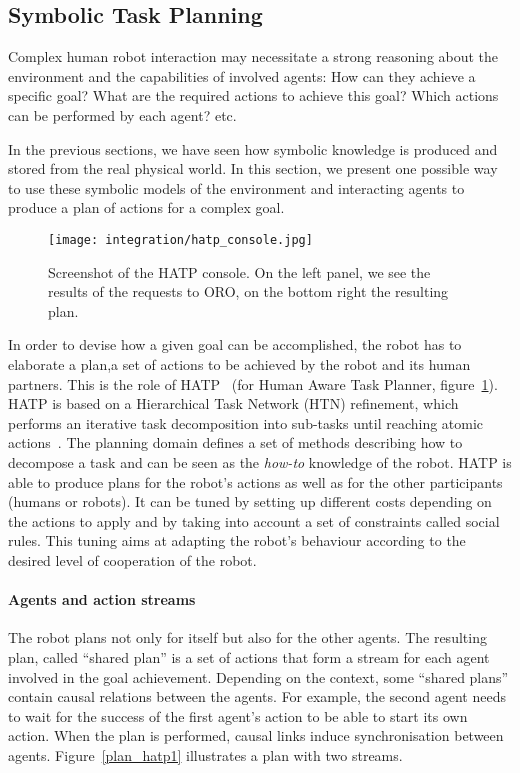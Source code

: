 
\subsection{Symbolic Task Planning}

Complex human robot interaction may necessitate a strong reasoning about the
environment and the capabilities of involved agents: How can they achieve a
specific goal? What are the required actions to achieve this goal? Which
actions can be performed by each agent? etc.

In the previous sections, we have seen how symbolic knowledge is produced and
stored from the real physical world. In this section, we present one possible
way to use these symbolic models of the environment and interacting agents to
produce a plan of actions for a complex goal.

\begin{figure}
    \centering
    \texttt{[image: integration/hatp\_console.jpg]}
    \caption{Screenshot of the HATP console. On the left panel, we see the
    results of the requests to ORO, on the bottom right the resulting plan.}
    \label{fig|hatp_console}
\end{figure}

In order to devise how a given goal can be accomplished, the robot has to
elaborate a plan,\ie a set of actions to be achieved by the robot and its human
partners.  This is the role of HATP~\cite{Alili2009} (for Human Aware Task
Planner, figure~\ref{fig|hatp_console}).  HATP is based on a Hierarchical Task
Network (HTN) refinement, which performs an iterative task decomposition into
sub-tasks until reaching atomic actions~\cite{Nau2003}.  The planning domain
defines a set of methods describing how to decompose a task and can be seen as
the {\it how-to} knowledge of the robot.  HATP is able to produce plans for the
robot's actions as well as for the other participants (humans or robots). It
can be tuned by setting up different costs depending on the actions to apply
and by taking into account a set of constraints called social rules. This
tuning aims at adapting the robot's behaviour according to the desired level of
cooperation of the robot.

\paragraph{Agents and action streams} The robot plans not only for itself but
also for the other agents. The resulting plan, called ``shared plan'' is a set
of actions that form a stream for each agent involved in the goal achievement.
Depending on the context, some ``shared plans'' contain causal relations
between the agents. For example, the second agent needs to wait for the success
of the first agent's action to be able to start its own action. When the plan
is performed, causal links induce synchronisation between agents.
Figure~\ref{plan_hatp1} illustrates a plan with two streams.

